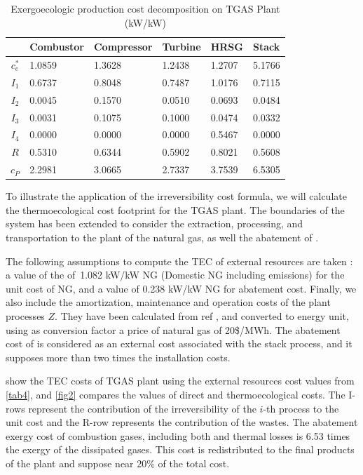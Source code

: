 \documentclass{ecos2018}
\begin{document}
\begin{table}[htbp]
	\caption{Exergoecologic production cost decomposition on TGAS Plant (kW/kW)}
	\begin{tabularx}{0.8\textwidth}{cZZZZZ}
		\addlinespace
		\toprule
		& Combustor & Compressor & Turbine & HRSG  & Stack \\
		\midrule
		$c_e^*$ & 1.0859 & 1.3628 & 1.2438 & 1.2707 & 5.1766 \\
		\midrule
		$I_1$   & 0.6737 & 0.8048 & 0.7487 & 1.0176 & 0.7115 \\
		$I_2$   & 0.0045 & 0.1570 & 0.0510 & 0.0693 & 0.0484 \\
		$I_3$   & 0.0031 & 0.1075 & 0.1000 & 0.0474 & 0.0332 \\
		$I_4$   & 0.0000 & 0.0000 & 0.0000 & 0.5467 & 0.0000 \\
		$R$     & 0.5310 & 0.6344 & 0.5902 & 0.8021 & 0.5608 \\
		\midrule
		$c_P$   & 2.2981 & 3.0665 & 2.7337 & 3.7539 & 6.5305 \\
		\bottomrule
	\end{tabularx}
	\label{tab5}
\end{table}

To illustrate the application of the irreversibility cost formula, we will calculate the thermoecological cost footprint for the TGAS plant. The boundaries of the system has been extended to consider the extraction, processing, and transportation to the plant of the natural gas, as well the abatement of . 

The following assumptions to compute the TEC of external resources are taken \cite{Uson2015}: a value of the of~1.082 kW/kW NG (Domestic NG including  emissions) for the unit cost of NG, and a value of 0.238 kW/kW NG for  abatement cost.  Finally, we also include the amortization, maintenance and operation costs of the plant processes $Z$. They have been calculated from ref \cite{CGAM1994}, and converted to energy unit, using as conversion factor a price of natural gas of 20\$/MWh. The abatement cost of  is considered as an external cost associated with the stack process, and it supposes more than two times the installation costs.

 show the TEC costs of TGAS plant using the external resources cost values from \cref{tab4}, and \cref{fig2} compares the values of direct and thermoecological costs.
The I-rows represent the contribution of the irreversibility of the $i$-th process to the unit cost and the R-row represents the contribution of the wastes. The abatement exergy cost of combustion gases, including both   and thermal losses is 6.53 times the exergy of the dissipated gases. This cost is redistributed to the final products of the plant and suppose near 20\% of the total cost.  
\end{document}
